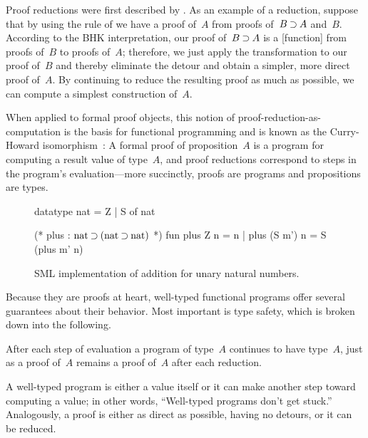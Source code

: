 Proof reductions were first described by \textcites{Gentzen:MZ35}{Prawitz:65}.
As an example of a reduction, suppose that by using the rule of  we have a proof of~$A$ from proofs of~$B \mathbin{\supset} A$ and~$B$.
According to the \ac{BHK} interpretation, our proof of~$B \mathbin{\supset} A$ is a [function] from proofs of~$B$ to proofs of~$A$; therefore,
we just apply the transformation to our proof of~$B$ and thereby eliminate the  detour and obtain a simpler, more direct proof of~$A$.
By continuing to reduce the resulting proof as much as possible, we can compute a simplest construction of~$A$.

When applied to formal proof objects, this notion of proof-reduction-as-computation is the basis for functional programming and is known as the Curry-Howard isomorphism~\autocites{Howard:Curry80}{Martin-Lof:LMPS80}:
A formal proof of proposition~$A$ is a program for computing a result value of type~$A$, and proof reductions correspond to steps in the program's evaluation---more succinctly, proofs are programs and propositions are types.

\begin{figure}[!t]
  \begin{pyglist}[language=sml, gobble=4, texcl=true]
    datatype nat = Z | S of nat
  
    (* plus : $\text{nat} \mathbin{\supset} (\text{nat} \mathbin{\supset} \text{nat})$ *) 
    fun plus Z n = n
      | plus (S m') n = S (plus m' n)
  \end{pyglist}
  \caption{\ac{SML} implementation of addition for unary natural numbers.\label{lst:smlplus}}
\end{figure}

Because they are proofs at heart, well-typed functional programs offer several guarantees about their behavior.
Most important is type safety, which is broken down into the following.
\begin{description}[font=\normalfont\itshape]
\item[Type preservation.]
  After each step of evaluation a program of type~$A$ continues to have type~$A$, just as a proof of~$A$ remains a proof of~$A$ after each reduction.
%
\item[Progress.]
  A well-typed program is either a value itself or it can make another step toward computing a value; in other words, \enquote{Well-typed programs don't get stuck.}
  Analogously, a proof is either as direct as possible, having no detours, or it can be reduced.
%
\end{description}

